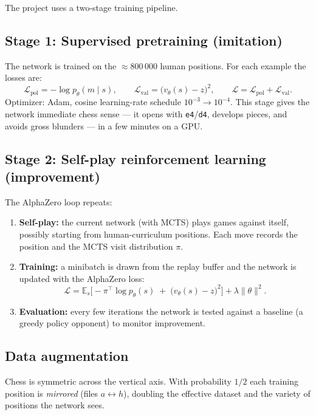 \documentclass[11pt,a4paper]{article}
\begin{document}
The project uses a two-stage training pipeline.

\subsection{Stage 1: Supervised pretraining (imitation)}
The network is trained on the $\approx$800\,000 human positions. For each
example the losses are:
\[
\mathcal{L}_{\mathrm{pol}}=-\log p_{\theta}(m \mid s),
\qquad
\mathcal{L}_{\mathrm{val}}=\big(v_{\theta}(s)-z\big)^2,
\qquad
\mathcal{L}=\mathcal{L}_{\mathrm{pol}}+\mathcal{L}_{\mathrm{val}}.
\]
Optimizer: Adam, cosine learning-rate schedule $10^{-3}\rightarrow10^{-4}$.
This stage gives the network immediate chess sense --- it opens with
\texttt{e4}/\texttt{d4}, develops pieces, and avoids gross blunders --- in a
few minutes on a GPU.

\subsection{Stage 2: Self-play reinforcement learning (improvement)}
The AlphaZero loop repeats:
\begin{enumerate}
  \item \textbf{Self-play:} the current network (with MCTS) plays games against
        itself, possibly starting from human-curriculum positions. Each move
        records the position and the MCTS visit distribution $\pi$.
  \item \textbf{Training:} a minibatch is drawn from the replay buffer and the
        network is updated with the AlphaZero loss:
        \[
        \mathcal{L}=\mathbb{E}_{s}\Big[
          -\pi^\top\log p_{\theta}(s)\;+\;\big(v_{\theta}(s)-z\big)^2
        \Big]+\lambda\|\theta\|^2.
        \]
  \item \textbf{Evaluation:} every few iterations the network is tested against
        a baseline (a greedy policy opponent) to monitor improvement.
\end{enumerate}

\subsection{Data augmentation}
Chess is symmetric across the vertical axis. With probability $1/2$ each
training position is \emph{mirrored} (files $a\leftrightarrow h$), doubling the
effective dataset and the variety of positions the network sees.

\end{document}
